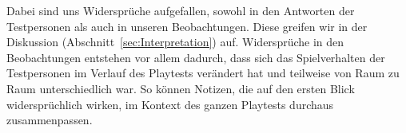\documentclass[../Main.tex]{subfiles}
\begin{document}
Dabei sind uns Widersprüche aufgefallen, sowohl in den Antworten der Testpersonen als auch in unseren Beobachtungen. Diese greifen wir in der Diskussion (Abschnitt~\ref{sec:Interpretation}) auf. Widersprüche in den Beobachtungen entstehen vor allem dadurch, dass sich das Spielverhalten der Testpersonen im Verlauf des Playtests verändert hat und teilweise von Raum zu Raum unterschiedlich war. So können Notizen, die auf den ersten Blick widersprüchlich wirken, im Kontext des ganzen Playtests durchaus zusammenpassen.
\end{document}
